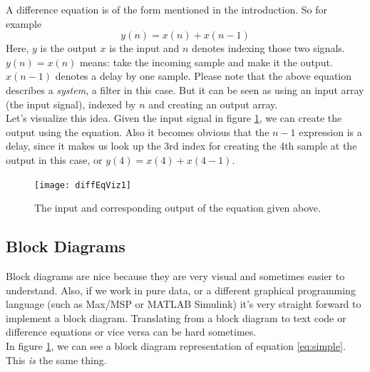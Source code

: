 A difference equation is of the form mentioned in the introduction. So for example 
\begin{equation}
	y(n) = x(n)+x(n-1)
	\label{eq:simple}
\end{equation}
Here, $y$ is the output $x$ is the input and $n$ denotes indexing those two signals.\\
$y(n)=x(n)$ means: take the incoming sample and make it the output. $x(n-1)$ denotes a delay by one sample. Please note that the above equation describes a \textit{system}, a filter in this case. But it can be seen as using an input array (the input signal), indexed by $n$ and creating an output array.\\
Let's visualize this idea. Given the input signal in figure \ref{fig:diffImpResp}, we can create the output using the equation. Also it becomes obvious that the $n-1$ expression is a delay, since it makes us look up the 3rd index for creating the 4th sample at the output in this case, or $y(4) = x(4)+x(4-1)$.
\begin{figure}[h!]
	\centering
	\texttt{[image: diffEqViz1]}
	\caption[shortCaption]
	{The input and corresponding output of the equation given above.}
	\label{fig:diffImpResp}
\end{figure}


\subsection{Block Diagrams} %
\label{sub:block}

Block diagrams are nice because they are very visual and sometimes easier to understand. Also, if we work in pure data, or a different graphical programming language (such as Max/MSP or MATLAB Simulink) it's very straight forward to implement a block diagram. Translating from a block diagram to text code or difference equations or vice versa can be hard sometimes.\\
In figure \ref{fig:diffImpResp}, we can see a block diagram representation of equation \ref{eq:simple}. This \textit{is} the same thing. 


